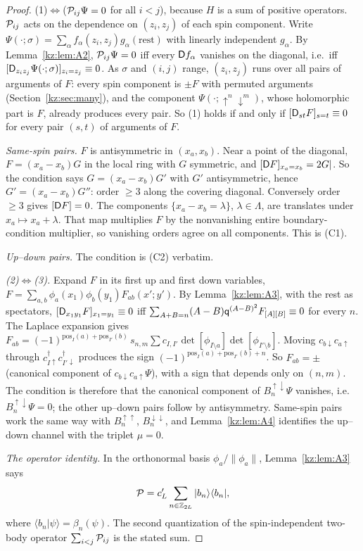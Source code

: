 \begin{proof}
(1)$\iff$($\mathcal{P}_{ij}\Psi=0$ for all $i<j$), because $H$ is a sum of positive operators. $\mathcal{P}_{ij}$
acts on the dependence on $(z_i,z_j)$ of each spin component. Write
$\Psi(\cdot;\sigma)=\sum_\alpha f_\alpha(z_i,z_j)g_\alpha(\text{rest})$ with linearly independent $g_\alpha$.
By Lemma~\ref{kz:lem:A2}, $\mathcal{P}_{ij}\Psi=0$ iff every $\mathsf{D} f_\alpha$ vanishes on the diagonal, i.e.\ iff
$[\mathsf{D}_{z_iz_j}\Psi(\cdot;\sigma)]_{z_i=z_j}\equiv0$. As $\sigma$ and $(i,j)$ range, $(z_i,z_j)$ runs over
all pairs of arguments of $F$: every spin component is $\pm F$ with permuted arguments
(Section~\ref{kz:sec:many}), and the component $\Psi(\cdot;\uparrow^n\downarrow^m)$, whose holomorphic part is $F$, already
produces every pair. So (1) holds if and only if $[\mathsf{D}_{st}F]_{s=t}\equiv0$ for every pair $(s,t)$ of arguments of $F$.

\emph{Same-spin pairs.} $F$ is antisymmetric in $(x_a,x_b)$. Near a point of the diagonal,
$F=(x_a-x_b)G$ in the local ring with $G$ symmetric, and $[\mathsf{D} F]_{x_a=x_b}=2G|$. So the condition says
$G=(x_a-x_b)G'$ with $G'$ antisymmetric, hence $G'=(x_a-x_b)G''$: order $\ge3$ along the covering
diagonal. Conversely order $\ge3$ gives $[\mathsf{D} F]=0$. The components $\{x_a-x_b=\lambda\}$, $\lambda\in\Lambda$,
are translates under $x_a\mapsto x_a+\lambda$. That map multiplies $F$ by the nonvanishing entire
boundary-condition multiplier, so vanishing orders agree on all components. This is (C1).

\emph{Up--down pairs.} The condition is (C2) verbatim.

\emph{(2)$\iff$(3).} Expand $F$ in its first up and first down variables,
$F=\sum_{a,b}\phi_a(x_1)\phi_b(y_1)F_{ab}(x';y')$. By Lemma~\ref{kz:lem:A3}, with the rest as
spectators, $[\mathsf{D}_{x_1y_1}F]_{x_1=y_1}\equiv0$ iff
$\sum_{A+B=n}(A-B)\mathsf{q}^{(A-B)^2}F_{[A][B]}\equiv0$ for every $n$. The Laplace expansion gives
$F_{ab}=(-1)^{\mathrm{pos}_I(a)+\mathrm{pos}_{I'}(b)}\,s_{n,m}\sum c_{I,I'}\det[\phi_{I\setminus a}]\det[\phi_{I'\setminus b}]$. Moving
$c_{b\downarrow}c_{a\uparrow}$ through $c^\dagger_{I\uparrow}c^\dagger_{I'\downarrow}$ produces the sign
$(-1)^{\mathrm{pos}_I(a)+\mathrm{pos}_{I'}(b)+n}$. So $F_{ab}=\pm$ (canonical component of
$c_{b\downarrow}c_{a\uparrow}\Psi$), with a sign that depends only on $(n,m)$. The condition is therefore that
the canonical component of $B^{\uparrow\downarrow}_n\Psi$ vanishes, i.e.\ $B^{\uparrow\downarrow}_n\Psi=0$; the other up--down
pairs follow by antisymmetry. Same-spin pairs work the same way with $B_n^{\uparrow\uparrow}$, $B_n^{\downarrow\downarrow}$, and
Lemma~\ref{kz:lem:A4} identifies the up--down channel with the triplet $\mu=0$.

\emph{The operator identity.} In the orthonormal basis $\phi_a/\|\phi_a\|$, Lemma~\ref{kz:lem:A3} says
\[
\mathcal{P}=c_L'\sum_{n\in\mathbb{Z}_{2L}}|b_n\rangle\langle b_n|,
\]
where $\langle b_n|\psi\rangle=\beta_n(\psi)$. The second quantization
of the spin-independent two-body operator $\sum_{i<j}\mathcal{P}_{ij}$ is the stated sum.
\end{proof}


